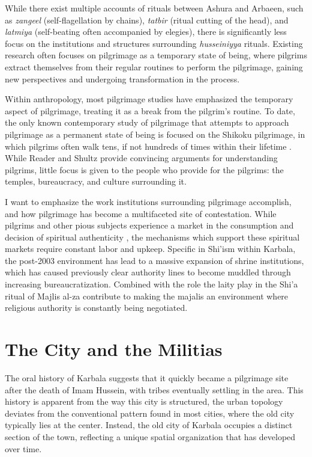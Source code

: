 While there exist multiple accounts of rituals between Ashura and Arbaeen, such as \emph{zangeel} (self-flagellation by chains), \emph{tatbir} (ritual cutting of the head), and \emph{latmiya} (self-beating often accompanied by elegies), there is significantly less focus on the institutions and structures surrounding \emph{husseiniyya} rituals. Existing research often focuses on pilgrimage as a temporary state of being, where pilgrims extract themselves from their regular routines to perform the pilgrimage, gaining new perspectives and undergoing transformation in the process.

Within anthropology, most pilgrimage studies have emphasized the temporary aspect of pilgrimage, treating it as a break from the pilgrim's routine. To date, the only known contemporary study of pilgrimage that attempts to approach pilgrimage as a permanent state of being is focused on the Shikoku pilgrimage, in which pilgrims often walk tens, if not hundreds of times within their lifetime \cite[9]{reader_pilgrims_2021}. While Reader and Shultz provide convincing arguments for understanding pilgrims, little focus is given to the people who provide for the pilgrims: the temples, bureaucracy, and culture surrounding it.



I want to emphasize the work institutions surrounding pilgrimage accomplish, and how pilgrimage has become a multifaceted site of contestation. While pilgrims and other pious subjects experience a market in the consumption and decision of spiritual authenticity \cite{moufahim_pilgrimage_2018}\cite{mujtaba_husein_phenomenological_2018}, the mechanisms which support these spiritual markets require constant labor and upkeep. Specific in Shi'ism within Karbala, the post-2003 environment has lead to a massive expansion of shrine institutions, which has caused previously clear authority lines to become muddled through increasing bureaucratization. Combined with the role the laity play in the Shi'a ritual of Majlis al-{\araayn}za contribute to making the majalis an environment where religious authority is constantly being negotiated. 

\section{The City and the Militias}
The oral history of Karbala suggests that it quickly became a pilgrimage site after the death of Imam Hussein, with tribes eventually settling in the area. This history is apparent from the way this city is structured, the urban topology deviates from the conventional pattern found in most cities, where the old city typically lies at the center. Instead, the old city of Karbala occupies a distinct section of the town, reflecting a unique spatial organization that has developed over time. 


